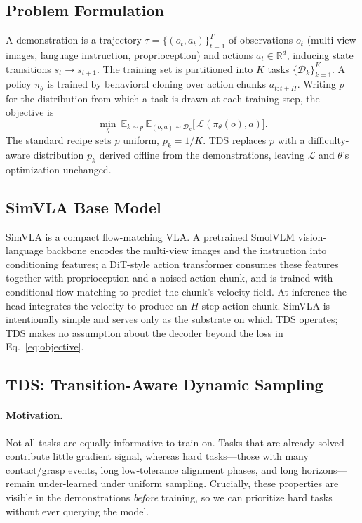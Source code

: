 \documentclass[letterpaper]{article} %
\newcommand{\tds}{TDS}
\newcommand{\pk}{p_{k}}
\begin{document}
\subsection{Problem Formulation}
A demonstration is a trajectory $\tau=\{(o_t,a_t)\}_{t=1}^{T}$ of observations $o_t$ (multi-view images, language instruction, proprioception) and actions $a_t\in\mathbb{R}^{d}$, inducing state transitions $s_t\!\to\!s_{t+1}$. The training set is partitioned into $K$ tasks $\{\mathcal{D}_k\}_{k=1}^{K}$. A policy $\pi_\theta$ is trained by behavioral cloning over action chunks $a_{t:t+H}$. Writing $p$ for the distribution from which a task is drawn at each training step, the objective is
\begin{equation}
\min_\theta\ \mathbb{E}_{k\sim p}\,\mathbb{E}_{(o,a)\sim\mathcal{D}_k}\big[\,\mathcal{L}\!\left(\pi_\theta(o),a\right)\big].
\label{eq:objective}
\end{equation}
The standard recipe sets $p$ uniform, $p_k=1/K$. \tds{} replaces $p$ with a difficulty-aware distribution $\pk$ derived offline from the demonstrations, leaving $\mathcal{L}$ and $\theta$'s optimization unchanged.

\subsection{SimVLA Base Model}
SimVLA is a compact flow-matching VLA. A pretrained SmolVLM vision-language backbone \citep{marafioti2025smolvlm} encodes the multi-view images and the instruction into conditioning features; a DiT-style action transformer \citep{peebles2023dit} consumes these features together with proprioception and a noised action chunk, and is trained with conditional flow matching \citep{lipman2023flow} to predict the chunk's velocity field. At inference the head integrates the velocity to produce an $H$-step action chunk. SimVLA is intentionally simple and serves only as the substrate on which \tds{} operates; \tds{} makes no assumption about the decoder beyond the loss in Eq.~\eqref{eq:objective}.

\subsection{TDS: Transition-Aware Dynamic Sampling}

\paragraph{Motivation.}
Not all tasks are equally informative to train on. Tasks that are already solved contribute little gradient signal, whereas hard tasks---those with many contact/grasp events, long low-tolerance alignment phases, and long horizons---remain under-learned under uniform sampling. Crucially, these properties are visible in the demonstrations \emph{before} training, so we can prioritize hard tasks without ever querying the model.
\end{document}
